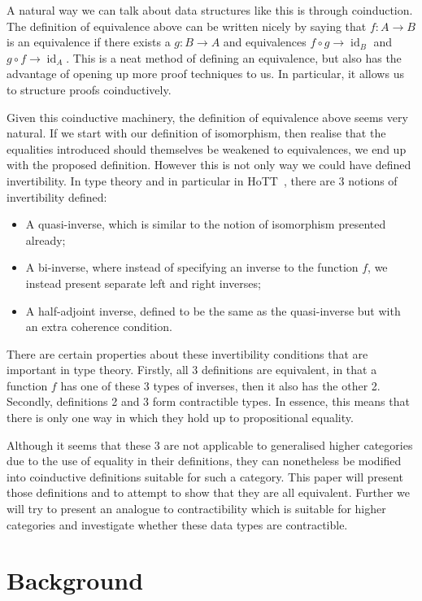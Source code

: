 \documentclass{article}
\theoremstyle{definition}
\theoremstyle{remark}
\DeclareMathOperator{\id}{id}
\begin{document}
A natural way we can talk about data structures like this is through coinduction. The definition of equivalence above can be written nicely by saying that \(f : A \to B\) is an equivalence if there exists a \(g : B \to A\) and equivalences \(f \circ g \to \id_B\) and \(g \circ f \to \id_A\). This is a neat method of defining an equivalence, but also has the advantage of opening up more proof techniques to us. In particular, it allows us to structure proofs coinductively.

Given this coinductive machinery, the definition of equivalence above seems very natural. If we start with our definition of isomorphism, then realise that the equalities introduced should themselves be weakened to equivalences, we end up with the proposed definition. However this is not only way we could have defined invertibility. In type theory and in particular in HoTT~\cite{hottbook}, there are 3 notions of invertibility defined:

\begin{itemize}
\item A quasi-inverse, which is similar to the notion of isomorphism presented already;
\item A bi-inverse, where instead of specifying an inverse to the function \(f\), we instead present separate left and right inverses;
\item A half-adjoint inverse, defined to be the same as the quasi-inverse but with an extra coherence condition.
\end{itemize}

There are certain properties about these invertibility conditions that are important in type theory. Firstly, all 3 definitions are equivalent, in that a function \(f\) has one of these 3 types of inverses, then it also has the other 2. Secondly, definitions 2 and 3 form contractible types. In essence, this means that there is only one way in which they hold up to propositional equality.

Although it seems that these 3 are not applicable to generalised higher categories due to the use of equality in their definitions, they can nonetheless be modified into coinductive definitions suitable for such a category. This paper will present those definitions and to attempt to show that they are all equivalent. Further we will try to present an analogue to contractibility which is suitable for higher categories and investigate whether these data types are contractible.

\section{Background}\label{sec:background}
\end{document}
